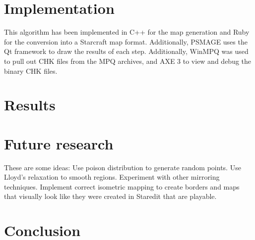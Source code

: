 \documentclass[letterpaper]{article}
\begin{document}


\section{Implementation} %
\label{sec:implementation}
This algorithm has been implemented in C++ for the map generation and Ruby for the conversion into a Starcraft map format. Additionally, PSMAGE uses the Qt framework to draw the results of each step. Additionally, WinMPQ was used to pull out CHK files from the MPQ archives, and AXE 3 to view and debug the binary CHK files.


\section{Results} %
\label{sec:results}



\section{Future research} %
\label{sec:future_research}
These are some ideas:
Use poison distribution to generate random points.
Use Lloyd's relaxation to smooth regions.
Experiment with other mirroring techniques.
Implement correct isometric mapping to create borders and maps that visually look like they were created in Staredit that are playable.


\section{Conclusion} %
\label{sec:conclusion}





\end{document}

